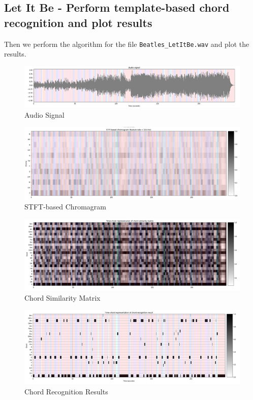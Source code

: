 \documentclass[
	12pt, %
]{fphw}
\begin{document}
\subsection*{Let It Be - Perform template-based chord recognition and plot results}

Then we perform the algorithm for the file \verb|Beatles_LetItBe.wav| and plot the results.

\begin{figure}[H]
 \centering
 \includegraphics[scale=1]{./images/1_audio_signal.png}
 \caption{Audio Signal}
\end{figure}

\begin{figure}[H]
 \centering
 \includegraphics[scale=1]{./images/1_stft_chromagram.png}
 \caption{STFT-based Chromagram}
\end{figure}

\begin{figure}[H]
 \centering
 \includegraphics[scale=1]{./images/1_chord_similarity.png}
 \caption{Chord Similarity Matrix}
\end{figure}

\begin{figure}[H]
 \centering
 \includegraphics[scale=1]{./images/1_recognition_results.png}
 \caption{Chord Recognition Results}
\end{figure}
\end{document}
